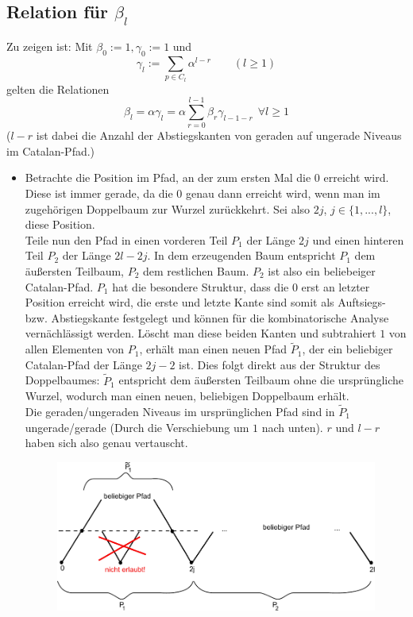 \documentclass[a4paper, 11pt]{scrreprt}
\begin{document}
\subsection*{Relation für $ \beta_l $}
Zu zeigen ist: Mit \(\beta_0 :=1, \gamma_0:=1 \) und
\begin{equation*}
		\gamma_l:=\sum_{p\in C_l} \alpha^{l-r} \qquad (l\geq 1)
\end{equation*}
gelten die Relationen
\begin{equation}
	\label{eq:beta_l}
	\beta_l = \alpha\gamma_l=\alpha\sum_{r=0}^{l-1}\beta_r \gamma_{l-1-r} ~~\forall l \geq 1
\end{equation}
(\(l-r\) ist dabei die Anzahl der Abstiegskanten von geraden auf ungerade Niveaus im Catalan-Pfad.)
\begin{itemize}

\item
Betrachte die Position im Pfad, an der zum ersten Mal die \(0\) erreicht wird. Diese ist immer gerade, da die \(0\) genau dann erreicht wird, wenn man im zugehörigen Doppelbaum zur Wurzel zurückkehrt. Sei also \(2j\), \(j\in\{1,...,l\}\), diese Position. \\
Teile nun den Pfad in einen vorderen Teil \(P_1\) der Länge \(2j\) und einen hinteren Teil \(P_2\) der Länge \(2l-2j\). In dem erzeugenden Baum entspricht \(P_1\) dem äußersten Teilbaum, \(P_2\) dem restlichen Baum. \(P_2\) ist also ein beliebeiger Catalan-Pfad. \(P_1\) hat die besondere Struktur, dass die \(0\) erst an letzter Position erreicht wird, die erste und letzte Kante sind somit als Auftsiegs- bzw. Abstiegskante festgelegt und können für die kombinatorische Analyse vernächlässigt werden. Löscht man diese beiden Kanten und subtrahiert \(1\) von allen Elementen von \(P_1\), erhält man einen neuen Pfad \(\tilde{P}_1\), der ein beliebiger Catalan-Pfad der Länge \(2j-2\) ist. Dies folgt direkt aus der Struktur des Doppelbaumes: \(\tilde{P}_1\) entspricht dem äußersten Teilbaum ohne die ursprüngliche Wurzel, wodurch man einen neuen, beliebigen Doppelbaum erhält. \\
Die geraden/ungeraden Niveaus im ursprünglichen Pfad sind in \(\tilde{P}_1\) ungerade/gerade (Durch die Verschiebung um \(1\) nach unten). \(r\) und \(l-r\) haben sich also genau vertauscht.
\begin{figure}[htpb]
	\centering
	\includegraphics[width=1.00\textwidth]{Rekursion-Visualisierung.pdf}

\end{figure}
\end{itemize}
\end{document}
